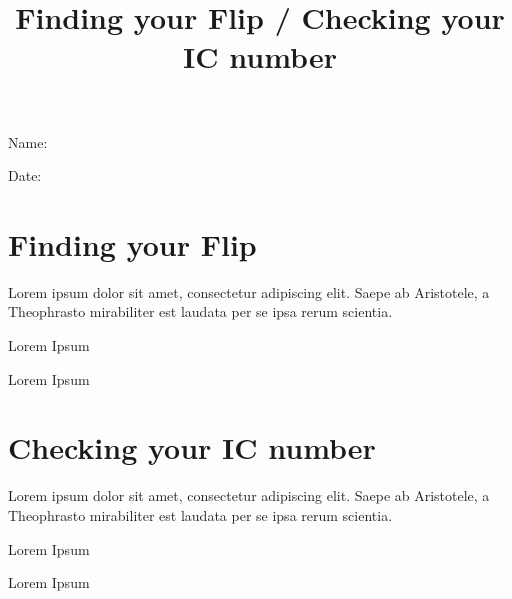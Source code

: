 \documentclass[a4paper,12pt]{article}
\title{Finding your Flip / Checking your IC number}
\newcommand\Blank[2][.33\linewidth]{%
  \rule{0pt}{4ex}%
  #2\enspace
  \makebox[#1]{\hrulefill}}
\begin{document}
\maketitle
\begin{flushright}
  \Blank{Name:}

  \Blank{Date:}
\end{flushright}


\section{Finding your Flip}
Lorem ipsum dolor sit amet, consectetur adipiscing elit.   Saepe ab Aristotele,
a Theophrasto mirabiliter est laudata per se ipsa rerum scientia.  

\begin{question}
Lorem Ipsum
\end{question}

\begin{question}
Lorem Ipsum
\end{question}

\section{Checking your IC number}
Lorem ipsum dolor sit amet, consectetur adipiscing elit.   Saepe ab Aristotele,
a Theophrasto mirabiliter est laudata per se ipsa rerum scientia.  

\begin{question}
Lorem Ipsum
\end{question}

\begin{question}
Lorem Ipsum
\end{question}
\end{document}
